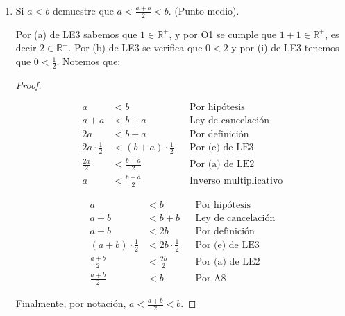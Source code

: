 \documentclass[11pt]{article}
\newcommand{\R}{\mathbb{R}}
\begin{document}
\begin{enumerate}[label=\alph*)]

    \item Si $a<b$ demuestre que $a<\frac{a+b}{2}<b$. (Punto medio).
    
    Por (a) de LE3 sabemos que $1 \in \R^+$, y por O1 se cumple que $1+1 \in \R^+$, es decir $2 \in \R^+$. Por (b) de LE3 se verifica que $0<2$ y por (i) de LE3 tenemos que $0<\frac{1}{2}$. Notemos que:
    \vspace{-1em}\begin{proof} \leavevmode
        \begin{center}
        \begin{minipage}[l]{.5\linewidth}
        \begin{align*}
        a &< b && \text{Por hipótesis} \\
        a + a &< b+a && \text{Ley de cancelación} \\
        2a &< b+a && \text{Por definición} \\
        2a \cdot \frac{1}{2} &< (b+a) \cdot \frac{1}{2} && \text{Por (e) de LE3} \\
        \frac{2a}{2} &< \frac{b+a}{2} && \text{Por (a) de LE2} \\
        a &< \frac{b+a}{2} && \text{Inverso multiplicativo}
        \end{align*}
        \end{minipage}%
        \begin{minipage}[r]{.5\linewidth}
        \begin{align*}
        a &< b && \text{Por hipótesis} \\
        a + b &< b+b && \text{Ley de cancelación} \\
        a +b &< 2b && \text{Por definición} \\
        (a+b) \cdot \frac{1}{2} &< 2b \cdot \frac{1}{2} && \text{Por (e) de LE3} \\
        \frac{a+b}{2} &< \frac{2b}{2} && \text{Por (a) de LE2} \\
        \frac{a+b}{2} &< b && \text{Por A8}
        \end{align*}
        \end{minipage}
        \end{center} Finalmente, por notación, $a < \frac{a+b}{2} < b$.
    \end{proof} \vspace{-1em}


\end{enumerate}
\end{document}
